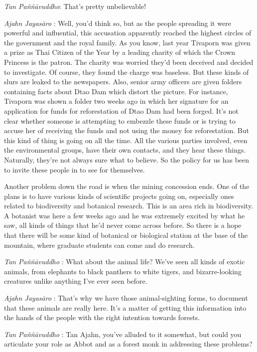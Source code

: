 \emph{Tan Paññāvuddho}: That's pretty unbelievable!

\emph{Ajahn Jayasāro }: Well, you'd think so, but as the people
spreading it were powerful and influential, this accusation apparently
reached the highest circles of the government and the royal family. As
you know, last year Tivaporn was given a prize as Thai Citizen of the
Year by a leading charity of which the Crown Princess is the patron. The
charity was worried they'd been deceived and decided to investigate. Of
course, they found the charge was baseless. But these kinds of slurs are
leaked to the newspapers. Also, senior army officers are given folders
containing facts about Dtao Dam which distort the picture. For instance,
Tivaporn was shown a folder two weeks ago in which her signature for an
application for funds for reforestation of Dtao Dam had been forged.
It's not clear whether someone is attempting to embezzle these funds or
is trying to accuse her of receiving the funds and not using the money
for reforestation. But this kind of thing is going on all the time. All
the various parties involved, even the environmental groups, have their
own contacts, and they hear these things. Naturally, they're not always
sure what to believe. So the policy for us has been to invite these
people in to see for themselves.

Another problem down the road is when the mining concession ends. One of
the plans is to have various kinds of scientific projects going on,
especially ones related to biodiversity and botanical research. This is
an area rich in biodiversity. A botanist was here a few weeks ago and he
was extremely excited by what he saw, all kinds of things that he'd
never come across before. So there is a hope that there will be some
kind of botanical or biological station at the base of the mountain,
where graduate students can come and do research.

\emph{Tan Paññāvuddho} : What about the animal life? We've seen all
kinds of exotic animals, from elephants to black panthers to white
tigers, and bizarre-looking creatures unlike anything I've ever seen
before.

\emph{Ajahn Jayasāro }: That's why we have those animal-sighting forms,
to document that these animals are really here. It's a matter of getting
this information into the hands of the people with the right intention
towards forests.

\emph{Tan Paññāvuddho} : Tan Ajahn, you've alluded to it somewhat, but
could you articulate your role as Abbot and as a forest monk in
addressing these problems?

